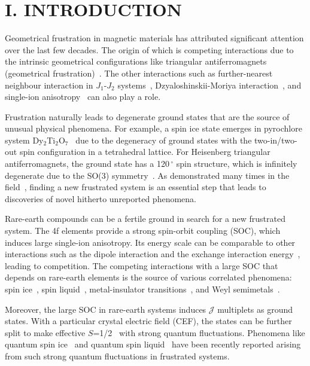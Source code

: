 \documentclass[aps,prl,reprint,amsmath,amssymb,superscriptaddress,showpacs]{revtex4-1}
\begin{document}
\section{I. INTRODUCTION}
Geometrical frustration in magnetic materials has attributed significant attention over the last few decades. The origin of which is competing interactions due to the intrinsic geometrical configurations like triangular antiferromagnets (geometrical frustration)~\cite{M.Collins1997,R.Moessner2001}. The other interactions such as further-nearest neighbour interaction in $J_1$-$J_2$ systems~\cite{M.Pregelj2015,R.Nath2009}, Dzyaloshinskii-Moriya interaction~\cite{M.Halg2014,W.Jin2017,J.Chung2013}, and single-ion anisotropy~\cite{A.Ramirez1999,S.Isakov2005} can also play a role.

Frustration naturally leads to degenerate ground states that are the source of unusual physical phenomena. For example, a spin ice state emerges in pyrochlore system Dy$_2$Ti$_2$O$_7$~\cite{A.Ramirez1999} due to the degeneracy of ground states with the two-in/two-out spin configuration in a tetrahedral lattice. For Heisenberg triangular antiferromagnets, the ground state has a 120$\,^{\circ}\mathrm{}$ spin structure, which is infinitely degenerate due to the SO(3) symmetry~\cite{H.Kawamura1985}.
As demonstrated many times in the field~\cite{A.Ramirez1999,Y.Shirata2012,J.Gardner2001,K.Ueda2016,E.Ma2015}, finding a new frustrated system is an essential step that leads to discoveries of novel hitherto unreported phenomena.

Rare-earth compounds can be a fertile ground in search for a new frustrated system. The 4f elements provide a strong spin-orbit coupling (SOC), which induces large single-ion anisotropy. Its energy scale can be comparable to other interactions such as the dipole interaction and the exchange interaction energy~\cite{A.Ramirez1999,S.Isakov2005}, leading to competition. The competing interactions with a large SOC that depends on rare-earth elements is the source of various correlated phenomena: spin ice~\cite{A.Ramirez1999}, spin liquid~\cite{J.Gardner2001}, metal-insulator transitions~\cite{K.Ueda2016}, and Weyl semimetals~\cite{E.Ma2015}.

Moreover, the large SOC in rare-earth systems induces $\mathcal{J}$ multiplets as ground states. With a particular crystal electric field (CEF), the states can be further split to make effective $S$=1/2~\cite{A.Ramirez1999,Y.Jana2002,S.Curnoe2013} with strong quantum fluctuations. Phenomena like quantum spin ice~\cite{K.Kimura2013,L.Pan2016} and quantum spin liquid~\cite{J.Gardner2001,H.Takatsu2011,Y.Tokiwa2014} have been recently reported arising from such strong quantum fluctuations in frustrated systems.
\end{document}
